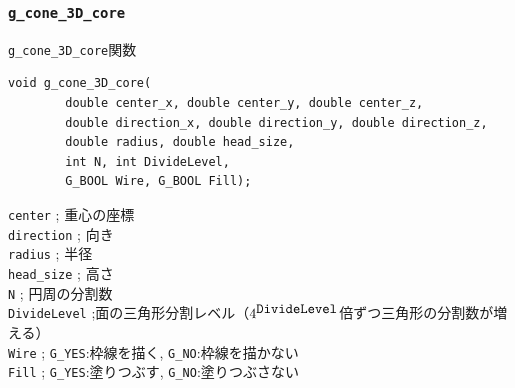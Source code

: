 \documentclass[platex,a4paper,12pt]{jsarticle}%
\begin{document}


\clearpage
\subsubsection{\texttt{g\_cone\_3D\_core}}

\begin{itembox}[l]{\texttt{g\_cone\_3D\_core}関数}
\begin{verbatim}
void g_cone_3D_core(
        double center_x, double center_y, double center_z,
        double direction_x, double direction_y, double direction_z,
        double radius, double head_size,
        int N, int DivideLevel, 
        G_BOOL Wire, G_BOOL Fill);
\end{verbatim}
\verb|center| ; 重心の座標\\
\verb|direction| ; 向き\\
\verb|radius| ; 半径\\
\verb|head_size| ; 高さ\\
\verb|N| ; 円周の分割数\\
\verb|DivideLevel| ;面の三角形分割レベル（$4^{\verb|DivideLevel|}$倍ずつ三角形の分割数が増える）\\
\verb|Wire| ; \verb|G_YES|:枠線を描く, \verb|G_NO|:枠線を描かない \\
\verb|Fill| ; \verb|G_YES|:塗りつぶす, \verb|G_NO|:塗りつぶさない 
\end{itembox}
\end{document}
